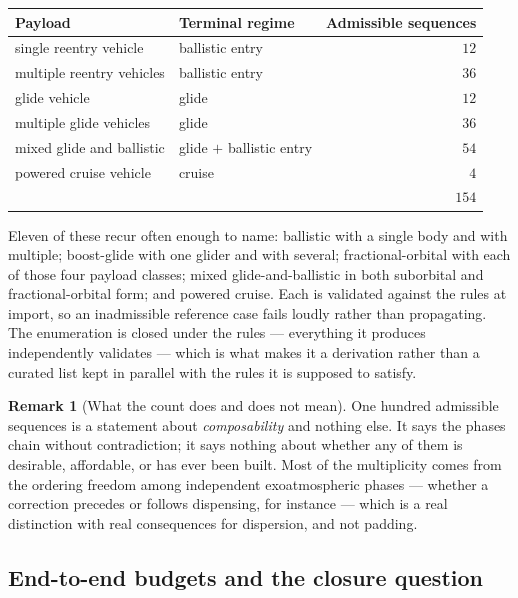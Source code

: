 \documentclass[11pt,a4paper]{article}
\theoremstyle{definition}
\newtheorem{remark}[theorem]{Remark}
\numberwithin{equation}{section}
\begin{document}
\begin{center}
\begin{tabular}{@{}llr@{}}
\toprule
\textbf{Payload} & \textbf{Terminal regime} & \textbf{Admissible sequences} \\
\midrule
single reentry vehicle & ballistic entry & $12$ \\
multiple reentry vehicles & ballistic entry & $36$ \\
glide vehicle & glide & $12$ \\
multiple glide vehicles & glide & $36$ \\
mixed glide and ballistic & glide $+$ ballistic entry & $54$ \\
powered cruise vehicle & cruise & $4$ \\
\midrule
& & $154$ \\
\bottomrule
\end{tabular}
\end{center}

Eleven of these recur often enough to name: ballistic with a single body and with multiple; boost-glide with one glider and with several; fractional-orbital with each of those four payload classes; mixed glide-and-ballistic in both suborbital and fractional-orbital form; and powered cruise. Each is validated against the rules at import, so an inadmissible reference case fails loudly rather than propagating. The enumeration is closed under the rules --- everything it produces independently validates --- which is what makes it a derivation rather than a curated list kept in parallel with the rules it is supposed to satisfy.

\begin{remark}[What the count does and does not mean]
One hundred admissible sequences is a statement about \emph{composability} and nothing else. It says the phases chain without contradiction; it says nothing about whether any of them is desirable, affordable, or has ever been built. Most of the multiplicity comes from the ordering freedom among independent exoatmospheric phases --- whether a correction precedes or follows dispensing, for instance --- which is a real distinction with real consequences for dispersion, and not padding.
\end{remark}

\subsection{End-to-end budgets and the closure question}
\label{sec:budget}
\end{document}
